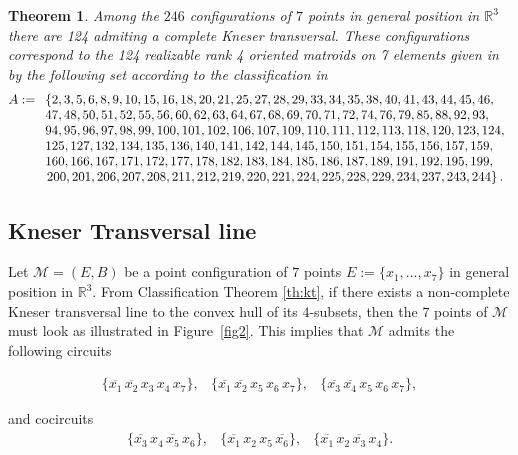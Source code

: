 \documentclass[11pt]{amsart}
\theoremstyle{plain}
\newtheorem{theorem}{Theorem}[section]
\theoremstyle{definition}
\theoremstyle{remark}
\begin{document}
\begin{theorem}\label{th:comp1}  
Among the $246$ configurations of $7$ points in general position in ${\mathbb{R}}^3$ there are 124 admiting a complete Kneser transversal. These configurations correspond to the 124 realizable rank 4 oriented matroids on 7 elements given in by the following set according to the classification in \cite{F}
{\scriptsize $$
A:=
\begin{array}[t]{l}
\left\{2,3,5,6,8,9,10,15,16,18,20,21,25,27,28,29,33,34,35,38,40,41,43,44,45,46,\right.\\
47,48,50,51,52,55,56,60,62,63,64,67,68,69,70,71,72,74,76,79,85,88,92,93,\\
94,95,96,97,98,99,100,101,102,106,107,109,110,111,112,113,118,120,123,124,\\
125,127,132,134,135,136,140,141,142,144,145,150,151,154,155,156,157,159,\\
160,166,167,171,172,177,178,182,183,184,185,186,187,189,191,192,195,199,\\
\left. 200,201,206,207,208,211,212,219,220,221,224,225,228,229,234,237,243,244\right\}.
\end{array}
$$}
\end{theorem}

\subsection{Kneser Transversal line}

Let $\mathcal{M}=(E,B)$ be a point configuration of $7$ points $E:=\{x_1,\ldots,x_7\}$ in general position in ${\mathbb{R}}^3$. From  Classification Theorem \ref{th:kt}, if there exists a non-complete Kneser transversal line to the convex hull of its $4$-subsets, then the $7$ points of $\mathcal{M}$ must look as illustrated in Figure~\ref{fig2}. This implies that $\mathcal{M}$ admits the following circuits

\begin{eqnarray}\label{eqa}
\{\overline{x_1}\, \overline{x_2}\, x_3\, x_4\, x_7\},
&
\{\overline{x_1}\, \overline{x_2}\, x_5\, x_6\, x_7\},
&
\{\overline{x_3}\, \overline{x_4}\, x_5\, x_6\, x_7\},
\end{eqnarray}

and cocircuits
\begin{eqnarray}\label{eqb}
\{\overline{x_3}\, x_4\, \overline{x_5}\, x_6\},
&
\{\overline{x_1}\, x_2\, x_5\, \overline{x_6}\},
&
\{\overline{x_1}\, x_2\, \overline{x_3}\, x_4\}.
\end{eqnarray}
\end{document}
